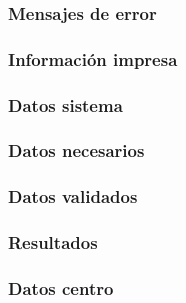   

  \subsubsection{Mensajes de error}

  

  \subsubsection{Información impresa}

  

  \subsubsection{Datos sistema}

  

  \subsubsection{Datos necesarios}

  

  \subsubsection{Datos validados}

  

  \subsubsection{Resultados}

  

  \subsubsection{Datos centro}

